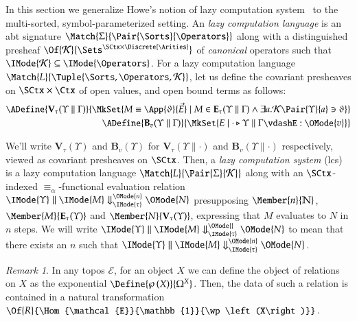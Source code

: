 \documentclass[11pt]{article}
\theoremstyle{definition}
\theoremstyle{remark}
\newtheorem{remark}[thm]{Remark}
\numberwithin{equation}{section}
\newcommand\Pow[1]{\wp\left(#1\right)}
\newcommand\IsSubsetEq[2]{\IMode{#1}\subseteq\IMode{#2}}
\newcommand\CanOperators{\mathcal{K}}
\newcommand\IsAbtUnmoded[5]{
  #1\triangleright%
  #2\parallel%
  #3\vdash%
  #4:\OMode{#5}%
}
\newcommand\EvalN[5]{\IMode{#1}\parallel\IMode{#4}\Downarrow^{\OMode{#3}}_{\IMode{#2}}\OMode{#5}}
\newcommand\Eval[4]{\EvalN{#1}{#2}{}{#3}{#4}}
\newcommand\Exprs{\mathbf{E}}
\newcommand\Values{\mathbf{V}}
\newcommand\BTms{\mathbf{B}}
\newcommand\Naturals{\mathbb{N}}
\begin{document}
In this section we generalize Howe's notion of lazy computation
system~\cite{howe:1989} to the multi-sorted, symbol-parameterized setting. An
\emph{lazy computation language} is an abt signature
$\Match{\Sigma}{\Pair{\Sorts}{\Operators}}$ along with a distinguished
presheaf $\Of{\CanOperators}{\Sets^{\SCtx\times\Discrete{\Arities}}}$ of
\emph{canonical} operators such that $\IsSubsetEq{\CanOperators}{\Operators}$.
For a lazy computation language
$\Match{L}{\Tuple{\Sorts,\Operators,\CanOperators}}$, let us define the
covariant presheaves on $\SCtx\times\Ctx$ of open values, and open bound terms
as follows:
\begin{align*}
  \ADefine{\Values_\tau(\Upsilon\parallel\Gamma)}{
    \MkSet{
      M\equiv\App{\vartheta}{\vec{E}}
      \mid M\in\Exprs_\tau(\Upsilon\parallel\Gamma)\land \exists a. \CanOperators\Pair{\Upsilon}{a}\ni\vartheta
    }
  }\\
  \ADefine{
    \BTms_{v}(\Upsilon\parallel\Gamma)
  }{
    \MkSet{E \mid \IsAbtUnmoded{\cdot}{\Upsilon}{\Gamma}{E}{v}}
  }
\end{align*}

We'll write $\Values_\tau(\Upsilon)$ and $\BTms_v(\Upsilon)$ for
$\Values_\tau(\Upsilon\parallel\cdot)$ and $\BTms_v(\Upsilon\parallel\cdot)$
respectively, viewed as covariant presheaves on $\SCtx$. Then, a \emph{lazy
computation system} (lcs) is a lazy computation language
$\Match{L}{\Pair{\Sigma}{\CanOperators}}$ along with an $\SCtx$-indexed
$\equiv_\alpha$-functional evaluation relation
$\EvalN{\Upsilon}{\tau}{n}{M}{N}$ presupposing $\Member{n}{\Naturals}$,
$\Member{M}{\Exprs_\tau(\Upsilon)}$ and $\Member{N}{\Values_\tau(\Upsilon)}$,
expressing that $M$ evaluates to $N$ in $n$ steps.  We will write
$\Eval{\Upsilon}{\tau}{M}{N}$ to mean that there exists an $n$ such that
$\EvalN{\Upsilon}{\tau}{n}{M}{N}$.

\begin{remark}
  In any topos $\mathcal{E}$, for an object $X$ we can define the object of
  relations on $X$ as the exponential $\Define{\Pow{X}}{\Omega^X}$. Then, the
  data of such a relation is contained in a natural transformation
  $\Of{R}{\Hom{\mathcal{E}}{\mathbb{1}}{\Pow{X}}}$.
\end{remark}

\newcommand\SBinRel[4]{\IMode{#2}\parallel\IMode{#3}\mathrel{#1}\IMode{#4}}
\end{document}

